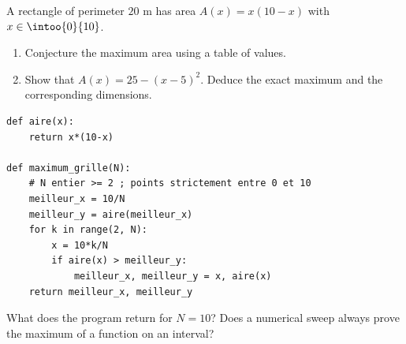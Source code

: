 \begin{example}A rectangle of perimeter $20$ m has area $A(x)=x(10-x)$ with $x\in\intoo{0}{10}$.
\begin{enumerate}\item Conjecture the maximum area using a table of values.\item Show that $A(x)=25-(x-5)^2$. Deduce the exact maximum and the corresponding dimensions.\end{enumerate}\end{example}
\begin{lstlisting}
def aire(x):
    return x*(10-x)

def maximum_grille(N):
    # N entier >= 2 ; points strictement entre 0 et 10
    meilleur_x = 10/N
    meilleur_y = aire(meilleur_x)
    for k in range(2, N):
        x = 10*k/N
        if aire(x) > meilleur_y:
            meilleur_x, meilleur_y = x, aire(x)
    return meilleur_x, meilleur_y
\end{lstlisting}
\begin{example}What does the program return for $N=10$? Does a numerical sweep always prove the maximum of a function on an interval?\end{example}
